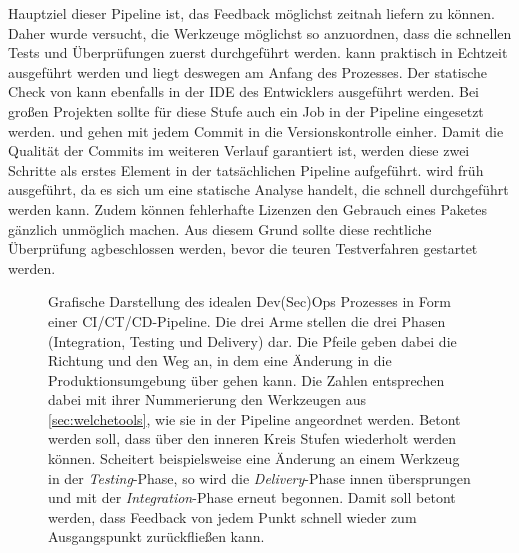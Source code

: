 Hauptziel dieser Pipeline ist, das Feedback möglichst zeitnah liefern zu können. Daher wurde versucht, die Werkzeuge möglichst so anzuordnen, dass die schnellen Tests und Überprüfungen zuerst durchgeführt werden.  kann praktisch in Echtzeit ausgeführt werden und liegt deswegen am Anfang des Prozesses. Der statische Check von  kann ebenfalls in der IDE des Entwicklers ausgeführt werden. Bei großen Projekten sollte für diese Stufe auch ein Job in der Pipeline eingesetzt werden.  und  gehen mit jedem Commit in die Versionskontrolle einher. Damit die Qualität der Commits im weiteren Verlauf garantiert ist, werden diese zwei Schritte als erstes Element in der tatsächlichen Pipeline aufgeführt. 
 wird früh ausgeführt, da es sich um eine statische Analyse handelt, die schnell durchgeführt werden kann. Zudem können fehlerhafte Lizenzen den Gebrauch eines Paketes gänzlich unmöglich machen. Aus diesem Grund sollte diese rechtliche Überprüfung agbeschlossen werden, bevor die \glqq teuren\grqq{} Testverfahren gestartet werden.

\begin{figure}[p]
    \vspace*{1cm}
    \setlength{\abovecaptionskip}{10pt}
    \setlength{\belowcaptionskip}{0pt}
    \centering
    \caption{Grafische Darstellung des \glqq idealen\grqq{} Dev(Sec)Ops Prozesses in Form einer CI/CT/CD-Pipeline. 
    Die drei Arme stellen die drei Phasen (Integration, Testing und Delivery) dar. Die Pfeile geben dabei die Richtung und den Weg an, in dem eine Änderung in die Produktionsumgebung über gehen kann. 
    Die Zahlen entsprechen dabei mit ihrer Nummerierung den Werkzeugen aus \ref{sec:welchetools}, wie sie in der Pipeline angeordnet werden. 
    Betont werden soll, dass über den inneren Kreis Stufen wiederholt werden können. Scheitert beispielsweise eine Änderung an einem Werkzeug in der \emph{Testing}-Phase, so wird die \emph{Delivery}-Phase innen übersprungen und mit der \emph{Integration}-Phase erneut begonnen. 
    Damit soll betont werden, dass Feedback von jedem Punkt schnell wieder zum Ausgangspunkt zurückfließen kann. }
    \label{fig:cicdprocess}
\end{figure}


